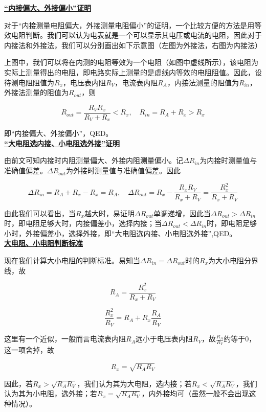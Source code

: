 \noindent \uline{\textbf{“内接偏大、外接偏小”证明}}

对于“内接测量电阻偏大，外接测量电阻偏小”的证明，一个比较方便的方法是用等效电阻判断。我们可以认为电表就是一个可以显示其电压或电流的电阻，因此对于内接法和外接法，我们可以分别画出如下示意图（左图为外接法，右图为内接法）



上图中，我们可以将在内测的电阻等效为一个电阻（如图中虚线所示），该电阻为实际上测量得出的电阻，即电路实际上测量的是虚线内等效的电阻阻值。因此，设待测电阻阻值为$R_x$，电压表内阻$R_V$，电流表内阻$R_A$，内接法测量的阻值为$R_{in}$，外接法测量的阻值为$R_{out}$，则

\begin{equation}
\boxed{R_{out} = \frac{R_V R_x}{R_V + R_x} < R_x ,\quad R_{in} = R_A + R_x > R_x}
\end{equation}

即“内接偏大、外接偏小”，QED。
~\\

\noindent \uline{\textbf{“大电阻选内接、小电阻选外接”证明}}

由前文可知内接时内阻测量偏大、外接内阻测量偏小。记$\Delta R_{in}$为内接时测量值与准确值偏差。$\Delta R_{out}$为外接时测量值与准确值偏差。因此

$$\Delta R_{in} = R_A + R_x - R_x = R_A ,\quad \Delta R_{out} = R_x - \frac{R_x R_V}{R_x + R_V} = \frac{R_x^2}{R_x + R_V}$$

由此我们可以看出，当$R_x$越大时，易证明$\Delta R_{out}$单调递增，因此当$\Delta R_{out} > \Delta R_{in}$时，即电阻足够大时，内接偏差小，选择内接；当$\Delta R_{out} < \Delta R_{in}$时，即电阻足够小时，外接偏差小，选择外接，即“大电阻选内接、小电阻选外接”,QED。
~\\

\noindent \uline{\textbf{大电阻、小电阻判断标准}}

现在我们计算大小电阻的判断标准。易知当$\Delta R_{in} = \Delta R_{out}$时的$R_x$为大小电阻分界线，故

$$R_A = \frac{R_x^2}{R_x + R_V}$$

$$\frac{R_x^2}{R_V} = R_A + R_x \frac{R_A}{R_V}$$

这里有一个近似，一般而言电流表内阻$R_A$远小于电压表内阻$R_V$，故$\frac{R_A}{R_V}$约等于$0$，这一项舍掉，故

\begin{equation}
\boxed{R_x = \sqrt{R_A R_V}}
\end{equation}

因此，若$R_x > \sqrt{R_A R_V}$，我们认为其为大电阻，选内接；若$R_x < \sqrt{R_A R_V}$，我们认为其为小电阻，选外接；若$R_x = \sqrt{R_A R_V}$，内外接均可（虽然一般不会出现这种情况）。

